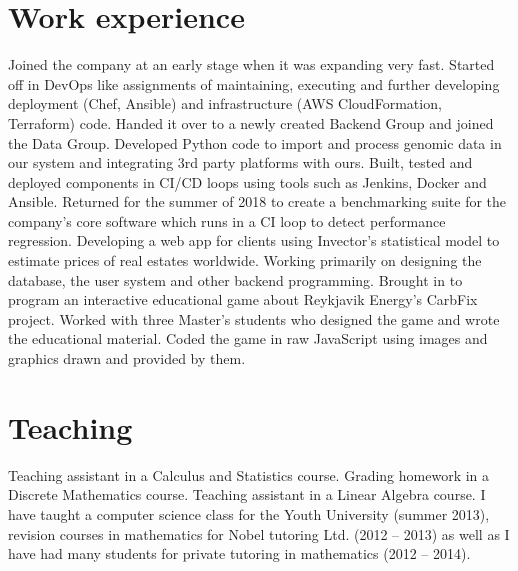 \documentclass[11pt,a4paper,sans]{moderncv}
\begin{document}
\section{Work experience}
{Joined the company at an early stage when it was expanding very fast.
Started off in DevOps like assignments of maintaining, executing and
further developing deployment (Chef, Ansible) and infrastructure (AWS
CloudFormation, Terraform) code. Handed it over to a newly created Backend
Group and joined the Data Group. Developed Python code to import and process
genomic data in our system and integrating 3rd party platforms with ours.
Built, tested and deployed components in CI/CD loops using tools such as
Jenkins, Docker and Ansible. Returned for the summer of 2018 to create a
benchmarking suite for the company's core software which runs in a CI loop to
detect performance regression.}
{Developing a web app for clients using Invector's statistical model to estimate 
prices of real estates worldwide. Working primarily on designing the database, 
the user system and other backend programming.}
{Brought in to program an interactive educational game about Reykjavik Energy's
CarbFix project. Worked with three Master's students who designed the game and
wrote the educational material. Coded the game in raw JavaScript using images
and graphics drawn and provided by them.}

\section{Teaching}
{Teaching assistant in a Calculus and Statistics course. Grading homework
in a Discrete Mathematics course.}
{Teaching assistant in a Linear Algebra course.}
{I have taught a computer science class for the Youth University
(summer 2013), revision courses in mathematics for Nobel tutoring Ltd.
(2012 -- 2013) as well as I have had many students for private tutoring
in mathematics (2012 -- 2014).}
\end{document}
